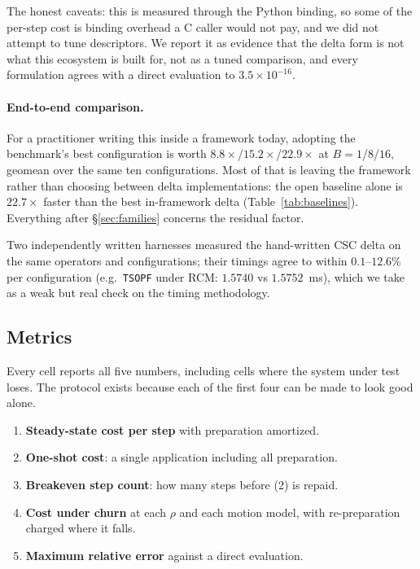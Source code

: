 \documentclass{article}
\begin{document}
The honest caveats: this is measured through the Python binding, so some of the
per-step cost is binding overhead a C caller would not pay, and we did not
attempt to tune descriptors. We report it as evidence that the delta form is not
what this ecosystem is built for, not as a tuned comparison, and every
formulation agrees with a direct evaluation to $3.5 \times 10^{-16}$.

\paragraph{End-to-end comparison.}
For a practitioner writing this inside a framework today, adopting the
benchmark's best configuration is worth $8.8\times$/$15.2\times$/$22.9\times$ at
$B{=}1$/$8$/$16$, geomean over the same ten configurations. Most of that
is leaving the framework rather than choosing between delta implementations: the
open baseline alone is $22.7\times$ faster than the best in-framework delta
(Table~\ref{tab:baselines}). Everything after \S\ref{sec:families} concerns the
residual factor.

Two independently written harnesses measured the hand-written CSC delta on the
same operators and configurations; their timings agree to within $0.1$--$12.6\%$
per configuration (e.g.\ \texttt{TSOPF} under RCM: $1.5740$ vs $1.5752$~ms), which
we take as a weak but real check on the timing methodology.

\subsection{Metrics}
\label{sec:metrics}

Every cell reports all five numbers, including cells where the system under test
loses. The protocol exists because each of the first four can be made to look
good alone.

\begin{enumerate}
\itemsep1pt
\item \textbf{Steady-state cost per step} with preparation amortized.
\item \textbf{One-shot cost}: a single application including all preparation.
\item \textbf{Breakeven step count}: how many steps before (2) is repaid.
\item \textbf{Cost under churn} at each $\rho$ and each motion model, with
re-preparation charged where it falls.
\item \textbf{Maximum relative error} against a direct evaluation.
\end{enumerate}
\end{document}
